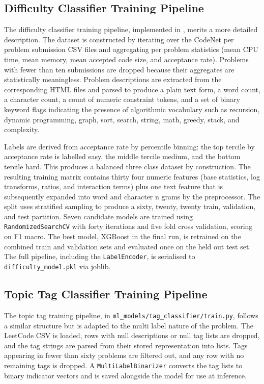\subsection{Difficulty Classifier Training Pipeline}

The difficulty classifier training pipeline, implemented in
,
merits a more detailed description. The dataset is constructed by
iterating over the CodeNet \cite{puri2021codenet} per problem submission
CSV files and aggregating per problem statistics (mean CPU time, mean
memory, mean accepted code size, and acceptance rate). Problems with
fewer than ten submissions are dropped because their aggregates are
statistically meaningless. Problem descriptions are extracted from the
corresponding HTML files and parsed to produce a plain text form, a
word count, a character count, a count of numeric constraint tokens,
and a set of binary keyword flags indicating the presence of
algorithmic vocabulary such as recursion, dynamic programming, graph,
sort, search, string, math, greedy, stack, and complexity.

Labels are derived from acceptance rate by percentile binning: the top
tercile by acceptance rate is labelled easy, the middle tercile medium,
and the bottom tercile hard. This produces a balanced three class
dataset by construction. The resulting training matrix contains thirty
four numeric features (base statistics, log transforms, ratios, and
interaction terms) plus one text feature that is subsequently expanded
into word and character n grams by the preprocessor. The split uses
stratified sampling to produce a sixty, twenty, twenty train, validation,
and test partition. Seven candidate models are trained using
\texttt{RandomizedSearchCV} \cite{bergstra2012random} with forty
iterations and five fold cross validation, scoring on F1 macro. The
best model, XGBoost \cite{chen2016xgboost} in the final run, is
retrained on the combined train and validation sets and evaluated once
on the held out test set. The full pipeline, including the
\texttt{LabelEncoder}, is serialised to \texttt{difficulty\_model.pkl} via joblib.

\subsection{Topic Tag Classifier Training Pipeline}

The topic tag training pipeline, in \texttt{ml\_models/tag\_classifier/train.py},
follows a similar structure but is adapted to the multi label nature of
the problem. The LeetCode \cite{kaggleleetcode2025} CSV is loaded, rows with
null descriptions or null tag lists are dropped, and the tag strings
are parsed from their stored representation into lists. Tags appearing
in fewer than sixty problems are filtered out, and any row with no
remaining tags is dropped. A \texttt{MultiLabelBinarizer} converts the
tag lists to binary indicator vectors and is saved alongside the model
for use at inference.


